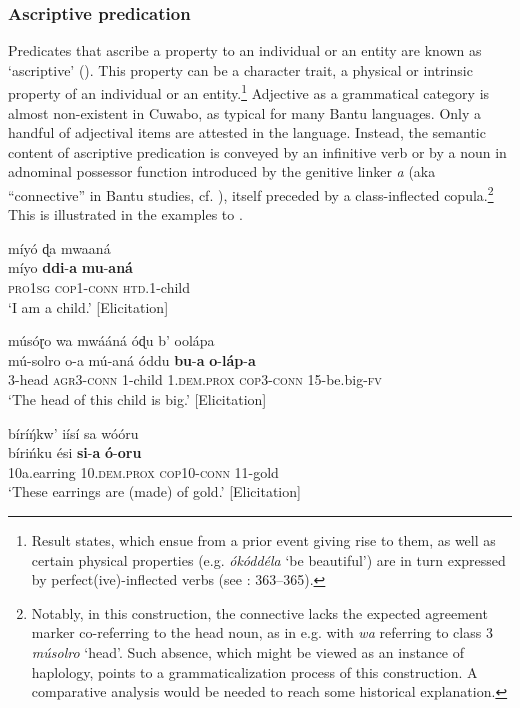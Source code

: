 \documentclass[output=paper,colorlinks=true, citecolor=brown,draftmode]{langscibook}
\begin{document}
\subsubsection{Ascriptive predication}\label{sec:cuw:2.3.2}
Predicates that ascribe a property to an individual or an entity are known as ‘ascriptive’ (\citealt{Hengeveld1990,Hengeveld1992}). This property can be a character trait, a physical or intrinsic property of an individual or an entity.\footnote{Result states, which ensue from a prior event giving rise to them, as well as certain physical properties (e.g. \textit{ókóddéla} ‘be beautiful’) are in turn expressed by perfect(ive)-inflected verbs (see \citealt{Guérois2015}: 363–365).} Adjective as a grammatical category is almost non-existent in Cuwabo, as typical for many Bantu languages. Only a handful of adjectival items are attested in the language. Instead, the semantic content of ascriptive predication is conveyed by an infinitive verb or by a noun in adnominal possessor function introduced by the genitive linker \textit{a} (aka “connective” in Bantu studies, cf. \citealt{VandeVelde2013}), itself preceded by a class-inflected copula.\footnote{Notably, in this construction, the connective lacks the expected agreement marker co-referring to the head noun, as in e.g.  with \textit{wa} referring to class 3 \textit{músolro} ‘head’. Such absence, which might be viewed as an instance of haplology, points to a grammaticalization process of this construction. A comparative analysis would be needed to reach some historical explanation.} This is illustrated in the  examples  to .

\ea\label{ex:cuw:17} míyó ɖa mwaaná  \\ 
    \gll míyo \textbf{ddi}{}-\textbf{a} \textbf{mu}{}-\textbf{aná}  \\
          \textsc{pro1sg} \textsc{cop1-conn} \textsc{htd.1}{}-child \\
    \glt  ‘I am a child.’ [Elicitation]
\z 

\ea\label{ex:cuw:18} músóɽo wa mwááná óɖu b’ oolápa\\ 
    \gll  mú-solro o-a mú-aná óddu \textbf{bu}{}-\textbf{a} \textbf{o}{}-\textbf{láp}{}-\textbf{a}  \\
         3-head \textsc{agr3}{}-\textsc{conn} 1-child 1.\textsc{dem.prox} \textsc{cop3-conn} \textsc{15}{}-be.big-\textsc{fv} \\
    \glt ‘The head of this child is big.’ [Elicitation]
\z 

\ea\label{ex:cuw:19} bírí\'{ŋ}kw’ iísí sa wóóru  \\ 
    \gll bírińku ési \textbf{si}{}-\textbf{a} \textbf{ó}{}-\textbf{oru}  \\
           10a.earring 10.\textsc{dem.prox} \textsc{cop}10-\textsc{conn} 11-gold  \\ 
    \glt  ‘These earrings are (made) of gold.’ [Elicitation]
\z 
\end{document}
